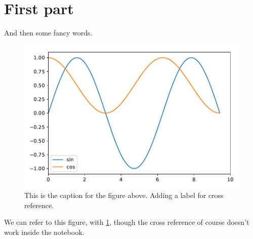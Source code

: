\documentclass{scrartcl}
\title{}
\author{}
\begin{document}
\maketitle





\section{First part}\label{first-part}

And then some fancy words.




\begin{figure}
\centering
\includegraphics{demofig}
\caption{This is the caption for the figure above. Adding a label for
cross reference. \label{fig:demo}}
\end{figure}

We can refer to this figure, with \ref{fig:demo}, though the cross
reference of course doesn't work inside the notebook.
\end{document}
